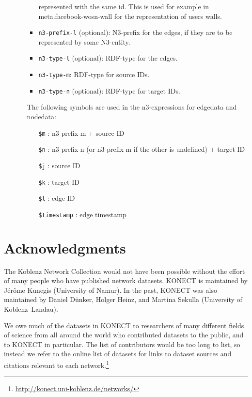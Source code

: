 \documentclass{article}
\begin{document}
\begin{itemize}
\begin{itemize}
\begin{itemize}
                          represented with the same id. This is used for
                          example in meta.facebook-wosn-wall for the
                          representation of users walls.
			\item \texttt{n3-prefix-l} (optional): N3-prefix
                          for the edges, if they are to be represented
                          by some N3-entity.
			\item \texttt{n3-type-l} (optional): RDF-type
                          for the edges.
			\item \texttt{n3-type-m}: RDF-type for source
                          IDs.
			\item \texttt{n3-type-n} (optional): RDF-type
                          for target IDs.
		\end{itemize}
		The following symbols are used in the n3-expressions for
                edgedata and nodedata:
		\begin{itemize}
			\item[\texttt{\$m}]: n3-prefix-m + source ID
			\item[\texttt{\$n}]: n3-prefix-n (or n3-prefix-m
                          if the other is undefined) + target ID
			\item[\texttt{\$j}]: source ID
			\item[\texttt{\$k}]: target ID
			\item[\texttt{\$l}]: edge ID
			\item[\texttt{\$timestamp}]: edge timestamp
		\end{itemize}
    \end{itemize}
\end{itemize}

\section*{Acknowledgments}
The Koblenz Network Collection would not have been possible without the
effort of many people who have published network datasets.  
KONECT is maintained by Jérôme Kunegis (University of Namur). 
In the past, KONECT was also maintained by Daniel Dünker, Holger Heinz,
and Martina Sekulla (University of Koblenz--Landau). 

We owe much of the datasets in KONECT to researchers of many different
fields of science from all around the world who contributed datasets to
the public, and to KONECT in particular.  The list of contributors would
be too long to list, so instead we refer to the online list of datasets
for links to dataset sources and citations relevant to each
network.\footnote{\url{http://konect.uni-koblenz.de/networks/}}
\end{document}
